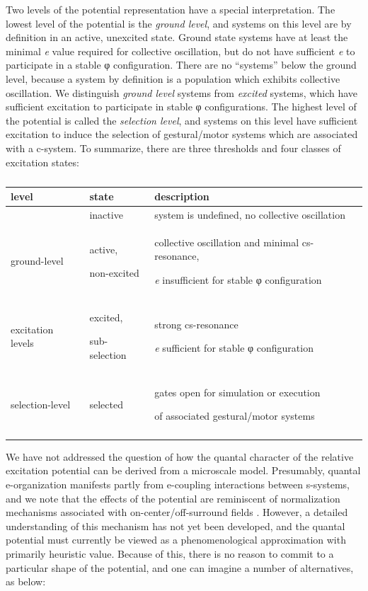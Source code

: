   Two levels of the potential representation have a special  interpretation. The lowest level of the potential is the \textit{ground level}, and systems on this level are by definition in an active, unexcited state. Ground state systems have at least the minimal \textit{e} value required for collective oscillation, but do not have sufficient \textit{e} to participate in a stable φ configuration. There are no “systems” below the ground level, because a system by definition is a population which exhibits collective oscillation. We distinguish \textit{ground level} systems from \textit{excited} systems, which have sufficient excitation to participate in stable φ configurations. The highest level of the potential is called the \textit{selection level}, and systems on this level have sufficient excitation to induce the selection of gestural/motor systems which are associated with a c-system. To summarize, there are three thresholds and four classes of excitation states:

\begin{table}
\begin{tabularx}{\textwidth}{llQ}
\lsptoprule
\textbf{level} & \textbf{state} & \textbf{description}\\
\midrule 
& inactive & system is undefined, no collective oscillation\\
\raggedleft ground-level & active,

non-excited & collective oscillation and minimal cs-resonance, 

\textit{e} insufficient for stable φ configuration\\
\raggedleft excitation levels & excited,

sub-selection & strong cs-resonance

\textit{e} sufficient for stable φ configuration\\
\raggedleft selection-level & selected & gates open for simulation or execution 

of associated gestural/motor systems\\
\lspbottomrule
\end{tabularx}
\caption{\missingcaption}\label{tab:1:2}
\end{table}
 
 We have not addressed the question of how the quantal character of the relative excitation potential can be derived from a microscale model. Presumably, quantal e-organization manifests partly from e-coupling interactions between s-systems, and we note that the effects of the potential are reminiscent of normalization mechanisms associated with on-center/off-surround fields \citep{Grossberg1978,Grossberg1987}. However, a detailed understanding of this mechanism has not yet been developed, and the quantal potential must currently be viewed as a phenomenological approximation with primarily heuristic value. Because of this, there is no reason to commit to a particular shape of the potential, and one can imagine a number of alternatives, as below:

